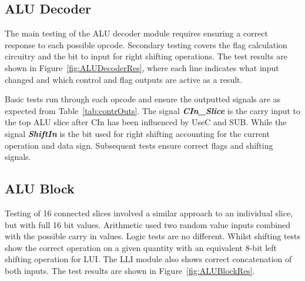 \subsection{ALU Decoder}
The main testing of the ALU decoder module requires ensuring a correct response to each possible opcode. Secondary testing covers the flag calculation circuitry and the bit to input for right shifting operations. The test results are shown in Figure~\ref{fig:ALUDecoderRes}, where each line indicates what input changed and which control and flag outputs are active as a result. 

Basic tests run through each opcode and ensure the outputted signals are as expected from Table~\ref{tab:contrOuts}. The signal {\bf \it CIn\_Slice} is the carry input to the top ALU slice after CIn has been influenced by UseC and SUB. While the signal {\bf \it ShiftIn} is the bit used for right shifting accounting for the current operation and data sign. Subsequent tests ensure correct flags and shifting signals. 

\subsection{ALU Block}
Testing of 16 connected slices involved a similar approach to an individual slice, but with full 16 bit values. Arithmetic used two random value inputs combined with the possible carry in values. Logic tests are no different. Whilst shifting tests show the correct operation on a given quantity with an equivalent 8-bit left shifting operation for LUI. The LLI module also shows correct concatenation of both inputs. The test results are shown in Figure~\ref{fig:ALUBlockRes}.


